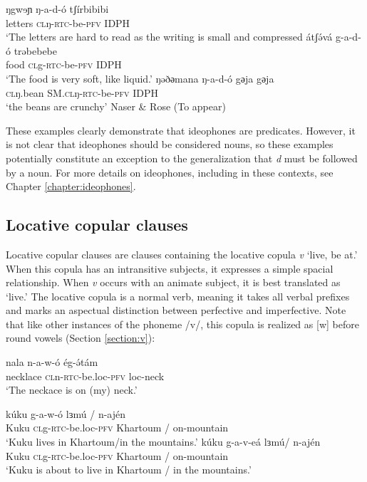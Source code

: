 \ea
	\ea \gll ŋgwɘɲ ŋ-a-d-ó tʃírbibibi\\
			 letters \textsc{cl}ŋ-\textsc{rtc}-be-\textsc{pfv} IDPH\\
		\glt `The letters are hard to read as the writing is small and compressed
	\ex \gll átʃə́vá g-a-d-ó trəbebebe\\
			food \textsc{cl}g-\textsc{rtc}-be-\textsc{pfv} IDPH\\
		\glt `The food is very soft, like liquid.'
	\ex \gll ŋəðәmana ŋ-a-d-ó gәja gәja\\
			\textsc{cl}ŋ.bean SM.\textsc{cl}ŋ-\textsc{rtc}-be-\textsc{pfv} IDPH\\
		\glt ‘the beans are crunchy’ \hfill Naser \& Rose (To appear)
\z 
\z

These examples clearly demonstrate that ideophones are predicates. However, it is not clear that ideophones should be considered nouns, so these examples potentially constitute an exception to the generalization that \textit{d} must be followed by a noun. For more details on ideophones, including in these contexts, see Chapter \ref{chapter:ideophones}.



\subsection{Locative copular clauses}\label{section:loccop}

Locative copular clauses are clauses containing the locative copula \textit{v} `live, be at.'  When this copula has an intransitive subjects, it expresses a simple spacial relationship. When \textit{v} occurs with an animate subject, it is best translated as `live.' The locative copula is a normal verb, meaning it takes all verbal prefixes and marks an aspectual distinction between perfective and imperfective. Note that like other instances of the phoneme /v/, this copula is realized as [w] before round vowels (Section \ref{section:v}):

	\ea 	\gll 	nala		n-a-w-ó 			ég-ə́tám	\\
					necklace	\textsc{cl}n-\textsc{rtc}-be.loc-\textsc{pfv} 	loc-neck\\
			\glt 	‘The neckace is on (my) neck.’	 \z 

\ea 
	\ea	\gll 	kúku		g-a-w-ó	      	lɜmú	/ n-ajén	\\
	 			Kuku 	\textsc{cl}g-\textsc{rtc}-be.loc-\textsc{pfv}	Khartoum / on-mountain 		\\
	 	\glt 	‘Kuku lives in Khartoum/in the mountains.’
	\ex	\gll 	kúku		g-a-v-eá	  	lɜmú/ n-ajén		\\
	 			Kuku 	\textsc{cl}g-\textsc{rtc}-be.loc-\textsc{pfv}	Khartoum / on-mountain 	\\
	 	\glt 	‘Kuku is about to live in Khartoum / in the mountains.’ \z \z 

